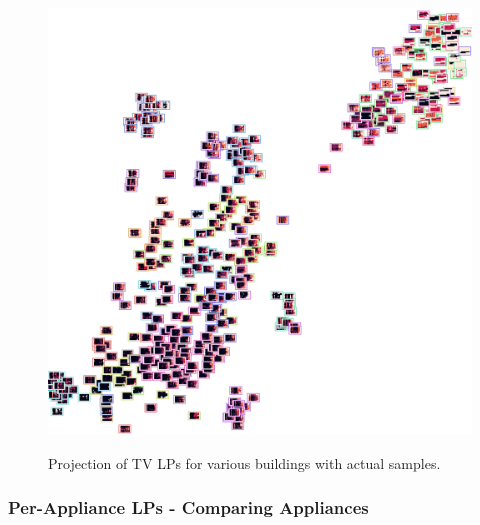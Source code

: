 \begin{figure}[H]
	\centering
	\caption{Projection of TV LPs for various buildings with actual samples.}
	\includegraphics[width=.9\textwidth]{Figures/TSNE/TSNE_per_appliance/all/img_scatter_alltelevision.png}
	\label{fig:tsne_pa_img_scatter_all_tv}
\end{figure}

\subsubsection{Per-Appliance LPs - Comparing Appliances}




